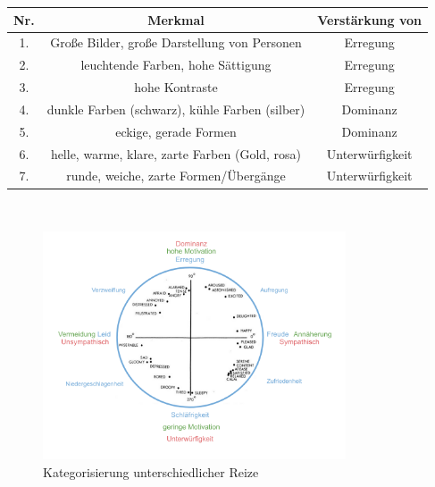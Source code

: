 \documentclass[./dokumentation.tex]{subfiles}
\begin{document}
\begin{center}
    \begin{tabular}{c | c | c}
            Nr. & Merkmal                                         & Verstärkung von \\
            \hline
            1.  & Große Bilder, große Darstellung von Personen    & Erregung \\
            2.  & leuchtende Farben, hohe Sättigung               & Erregung\\
            3.  & hohe Kontraste                                  & Erregung\\
            4.  & dunkle Farben (schwarz), kühle Farben (silber)  & Dominanz\\
            5.  & eckige, gerade Formen                           & Dominanz\\
            6.  & helle, warme, klare, zarte Farben  (Gold, rosa) & Unterwürfigkeit\\
            7.  & runde, weiche, zarte Formen/Übergänge           & Unterwürfigkeit\\
    \end{tabular} \\
\end{center}

\begin{figure}[h]
    \centering
    \includegraphics[width=0.8\textwidth]{bilder/dom-unt-bild.png}
    \caption{Kategorisierung unterschiedlicher Reize}
    \label{fig11:dom-unt}
\end{figure}\\
\end{document}
